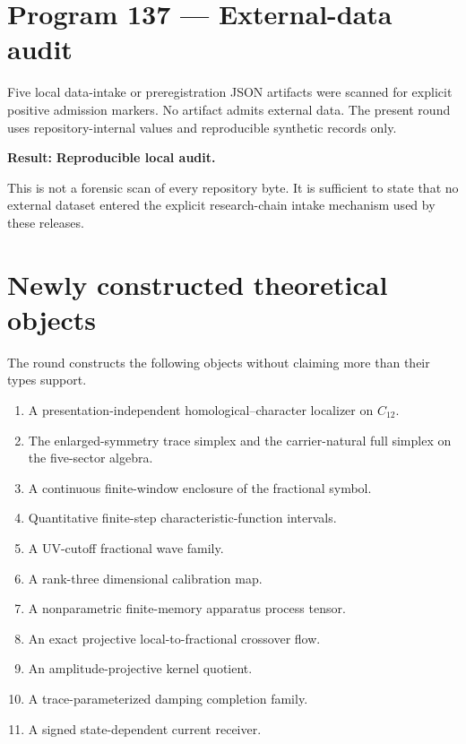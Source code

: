 \documentclass[11pt,a4paper,openany]{report}
\begin{document}
\section{Program 137 --- External-data audit}

Five local data-intake or preregistration JSON artifacts were scanned for explicit positive admission markers. No artifact admits external data. The present round uses repository-internal values and reproducible synthetic records only.

\textbf{Result:} \textbf{Reproducible local audit.}

This is not a forensic scan of every repository byte. It is sufficient to state that no external dataset entered the explicit research-chain intake mechanism used by these releases.

\section{Newly constructed theoretical objects}

The round constructs the following objects without claiming more than their types support.

\begin{enumerate}
\item 
A presentation-independent homological--character localizer on \(C_{12}\).

\item 
The enlarged-symmetry trace simplex and the carrier-natural full simplex on the five-sector algebra.

\item 
A continuous finite-window enclosure of the fractional symbol.

\item 
Quantitative finite-step characteristic-function intervals.

\item 
A UV-cutoff fractional wave family.

\item 
A rank-three dimensional calibration map.

\item 
A nonparametric finite-memory apparatus process tensor.

\item 
An exact projective local-to-fractional crossover flow.

\item 
An amplitude-projective kernel quotient.

\item 
A trace-parameterized damping completion family.

\item 
A signed state-dependent current receiver.

\end{enumerate}
\end{document}
